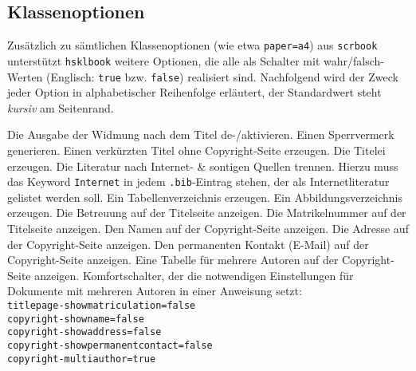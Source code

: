 \subsection{Klassenoptionen}
Zusätzlich zu sämtlichen Klassenoptionen (wie etwa \verb!paper=a4!) aus
\verb!scrbook! unterstützt \verb!hsklbook! weitere Optionen, die alle als
Schalter mit wahr/falsch-Werten (Englisch: \verb!true! bzw. \verb!false!)
realisiert sind. Nachfolgend wird der Zweck jeder Option in alphabetischer
Reihenfolge erläutert, der Standardwert steht \emph{kursiv} am Seitenrand.

\iffalse%
 Die Ausgabe der Widmung nach dem Titel de-/aktivieren.\dtrue
{} Einen Sperrvermerk generieren. \dfalse
{} Einen verkürzten Titel ohne Copyright-Seite erzeugen. \dfalse
{} Die Titelei erzeugen. \dtrue
{} Die \dfalse Literatur nach Internet- \& sontigen Quellen trennen. Hierzu muss das Keyword \verb!Internet! in jedem \verb!.bib!-Eintrag stehen, der als Internetliteratur gelistet werden soll.
 Ein Tabellenverzeichnis erzeugen. \dtrue
{} Ein Abbildungsverzeichnis erzeugen. \dtrue
{} Die Betreuung auf der Titelseite anzeigen. \dtrue
{} Die Matrikelnummer auf der Titelseite anzeigen. \dtrue
{} Den Namen auf der Copyright-Seite anzeigen. \dtrue
{} Die Adresse auf der Copyright-Seite anzeigen. \dtrue
{} Den permanenten Kontakt (E-Mail) auf der Copy\-right-Seite anzeigen. \dtrue
{} Eine Tabelle \dfalse für mehrere Autoren auf der Copyright-Seite anzeigen.
 Komfortschalter, \dfalse der die notwendigen Einstellungen für Dokumente mit mehreren Autoren in einer Anweisung setzt:\\\verb!titlepage-showmatriculation=false!\\\verb!copyright-showname=false!\\\verb!copyright-showaddress=false!\\\verb!copyright-showpermanentcontact=false!\\\verb!copyright-multiauthor=true!
